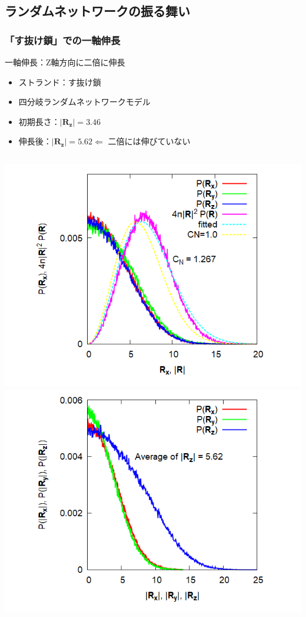 \documentclass[12pt, dvipdfmx]{beamer}
\begin{document}
\subsection{ランダムネットワークの振る舞い}

\begin{frame}
	\frametitle{「す抜け鎖」での一軸伸長}
		\begin{exampleblock}{一軸伸長：Z軸方向に二倍に伸長}
			\begin{itemize}
				\item ストランド：す抜け鎖
				\item 四分岐ランダムネットワークモデル
				\item 初期長さ：$|\bm{R_z}| = 3.46$
				\item 伸長後：$|\bm{R_z}| = 5.62 \Leftarrow$ \alert{二倍には伸びていない}
			\end{itemize}
		\end{exampleblock}
		\begin{columns}[totalwidth=\linewidth]
				\includegraphics[width=1.1\columnwidth]{4chain_E2E_init.png}
				\includegraphics[width=1.1\columnwidth]{Expand_4_Strand_histgram.png}
		\end{columns}
\end{frame}
\end{document}
